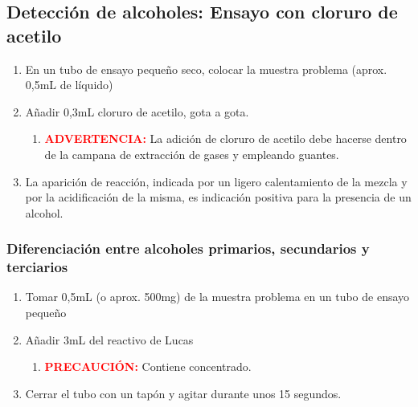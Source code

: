 \subsection{Detección de alcoholes: Ensayo con cloruro de acetilo}
\begin{enumerate}
    \item En un tubo de ensayo pequeño seco, colocar la muestra problema (aprox. 0,5mL de líquido)
    \item Añadir 0,3mL cloruro de acetilo, gota a gota.
    \begin{enumerate}
        \item[!] \textcolor{red}{\textbf{ADVERTENCIA:}} La adición de cloruro de acetilo debe hacerse dentro de la campana de extracción de gases y empleando guantes.
    \end{enumerate}
    \item La aparición de reacción, indicada por un ligero calentamiento de la mezcla y por la acidificación de la misma, es indicación positiva para la presencia de un alcohol.
\end{enumerate}

\subsubsection{Diferenciación entre alcoholes primarios, secundarios y terciarios}
\begin{enumerate}
    \item Tomar 0,5mL (o aprox. 500mg) de la muestra problema en un tubo de ensayo pequeño
    \item Añadir 3mL del reactivo de Lucas
    \begin{enumerate}
        \item[!] \textcolor{red}{\textbf{PRECAUCIÓN:}} Contiene  concentrado.
    \end{enumerate}
    \item Cerrar el tubo con un tapón y agitar durante unos 15 segundos.
\end{enumerate}

\begin{table}[H]
\end{table}

